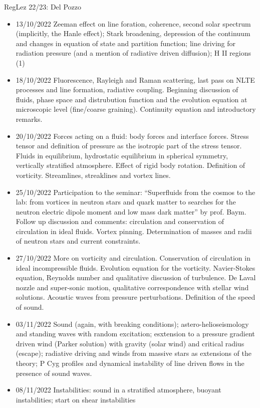 \begin{wordonframe}{RegLez 22/23: Del Pozzo}
\begin{itemize}
\item 13/10/2022 Zeeman effect on line foration, coherence, second solar spectrum (implicitly, the Hanle effect); Stark broadening, depression of the continuum and changes in equation of state and partition function; line driving for radiation pressure (and a mention of radiative driven diffusion); H II regions (1) 
\item 18/10/2022 Fluorescence, Rayleigh and Raman scattering, last pass on NLTE processes and line formation, radiative coupling. Beginning discussion of fluids, phase space and distrubution function and the evolution equation at microscopic level (fine/coarse graining). Continuity equation and introductory remarks. 
\item 20/10/2022 Forces acting on a fluid: body forces and interface forces. Stress tensor and definition of pressure as the isotropic part of the stress tensor. Fluids in equilibrium, hydrostatic equilibrium in spherical symmetry, vertically stratified atmosphere. Effect of rigid body rotation. Definition of vorticity. Streamlines, streaklines and vortex lines. 
\item 25/10/2022 Participation to the seminar: ``Superfluids from the cosmos to the lab: from vortices in neutron stars and quark matter to searches for the neutron electric dipole moment and low mass dark matter'' by prof. Baym. Follow up discussion and comments: circulation and conservation of circulation in ideal fluids. Vortex pinning. Determination of masses and radii of neutron stars and current constraints. 
\item 27/10/2022 More on vorticity and circulation. Conservation of circulation in ideal incompressible fluids. Evolution equation for the vorticity. Navier-Stokes equation, Reynolds number and qualitative discussion of turbulence. De Laval nozzle and super-sonic motion, qualitative correspondence with stellar wind solutions. Acoustic waves from pressure perturbations. Definition of the speed of sound. 
\item 03/11/2022 Sound (again, with breaking conditions); astero-helioseismology and standing waves with random excitation; esxtension to a pressure gradient driven wind (Parker solution) with gravity (solar wind) and critical radius (escape); radiative driving and winds from massive stars as extensions of the theory; P Cyg profiles and dynamical instability of line driven flows in the presence of sound waves. 
\item 08/11/2022 Instabilities: sound in a stratified atmosphere, buoyant instabilities; start on shear instabilities 

\end{itemize}
\end{wordonframe}
